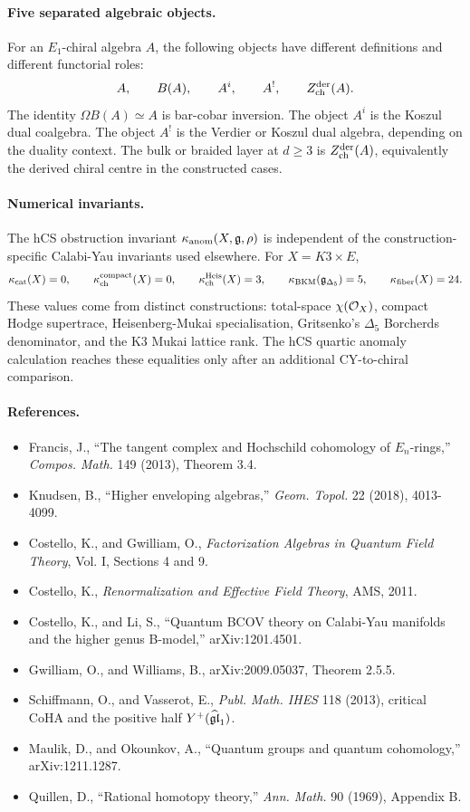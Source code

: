 \paragraph{Five separated algebraic objects.}
For an \(E_1\)-chiral algebra \(A\), the following objects have different
definitions and different functorial roles:
\[
  A,\qquad B(A),\qquad A^i,\qquad A^!,\qquad Z^{\mathrm{der}}_{\mathrm{ch}}(A).
\]
The identity \(\Omega B(A)\simeq A\) is bar-cobar inversion. The object
\(A^i\) is the Koszul dual coalgebra. The object \(A^!\) is the Verdier
or Koszul dual algebra, depending on the duality context. The bulk or
braided layer at \(d\geq3\) is \(Z^{\mathrm{der}}_{\mathrm{ch}}(A)\), equivalently the derived
chiral centre in the constructed cases.

\paragraph{Numerical invariants.}
The hCS obstruction invariant \(\kappa_{\mathrm{anom}}(X,\mathfrak{g},\rho)\) is independent of
the construction-specific Calabi-Yau invariants used elsewhere. For
\(X=K3\times E\),
\[
  \kappa_{\mathrm{cat}}(X)=0,\qquad
  \kappa_{\mathrm{ch}}^{\mathrm{compact}}(X)=0,\qquad
  \kappa_{\mathrm{ch}}^{\mathrm{Heis}}(X)=3,\qquad
  \kappa_{\mathrm{BKM}}(\mathfrak g_{\Delta_5})=5,\qquad
  \kappa_{\mathrm{fiber}}(X)=24.
\]
These values come from distinct constructions: total-space
\(\chi(\mathcal{O}_X)\), compact Hodge supertrace, Heisenberg-Mukai
specialisation, Gritsenko's \(\Delta_5\) Borcherds denominator, and the
K3 Mukai lattice rank. The hCS quartic anomaly calculation reaches these
equalities only after an additional CY-to-chiral comparison.

\paragraph{References.}
\begin{itemize}
  \item Francis, J., ``The tangent complex and Hochschild cohomology of
    \(E_n\)-rings,'' \emph{Compos. Math.} 149 (2013), Theorem 3.4.
  \item Knudsen, B., ``Higher enveloping algebras,''
    \emph{Geom. Topol.} 22 (2018), 4013-4099.
  \item Costello, K., and Gwilliam, O., \emph{Factorization Algebras in
    Quantum Field Theory}, Vol. I, Sections 4 and 9.
  \item Costello, K., \emph{Renormalization and Effective Field Theory},
    AMS, 2011.
  \item Costello, K., and Li, S., ``Quantum BCOV theory on Calabi-Yau
    manifolds and the higher genus B-model,'' arXiv:1201.4501.
  \item Gwilliam, O., and Williams, B., arXiv:2009.05037, Theorem 2.5.5.
  \item Schiffmann, O., and Vasserot, E., \emph{Publ. Math. IHES} 118
    (2013), critical CoHA and the positive half \(Y^+(\widehat{\mathfrak{gl}}_1)\).
  \item Maulik, D., and Okounkov, A., ``Quantum groups and quantum
    cohomology,'' arXiv:1211.1287.
  \item Quillen, D., ``Rational homotopy theory,'' \emph{Ann. Math.} 90
    (1969), Appendix B.
\end{itemize}
